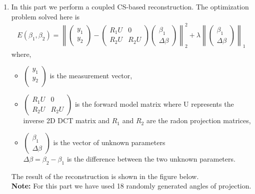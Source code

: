 \documentclass[12pt]{article}
\begin{document}
\begin{enumerate}[label = (\alph*)]
    \item In this part we perform a coupled CS-based reconstruction. The optimization problem solved here is
    \begin{gather*}
        E(\beta_1 , \beta_2) =  \left \lVert \begin{pmatrix} y_1 \\ y_2 \end{pmatrix} - \begin{pmatrix} R_1U & 0 \\ R_2U & R_2U \end{pmatrix}  \begin{pmatrix} \beta_1 \\ \Delta \beta \end{pmatrix}\right\rVert^2_2 + \lambda  \left \lVert\begin{pmatrix} \beta_1 \\ \Delta \beta \end{pmatrix} \right\rVert_1 
    \end{gather*}
    where, \\
    \begin{itemize}
        \item $ \begin{pmatrix} y_1 \\ y_2 \\ \end{pmatrix} $ is the measurement vector, \\
        \item $ \begin{pmatrix} R_1U & 0 \\ R_2U & R_2U \end{pmatrix} $ is the forward model matrix where U represents the inverse 2D DCT matrix and $R_1$ and $R_2$ are the radon projection matrices,\\
        \item $ \begin{pmatrix} \beta_1 \\ \Delta \beta \end{pmatrix} $ is the vector of unknown parameters \\
    $ \Delta \beta = \beta_2 - \beta_1 $ is the difference between the two unknown parameters.
\end{itemize}
    The result of the reconstruction is shown in the figure below. \\
    \textbf{Note:} For this part we have used 18 randomly generated angles of projection.
    \begin{figure}[H]

\end{figure}
\end{enumerate}
\end{document}
